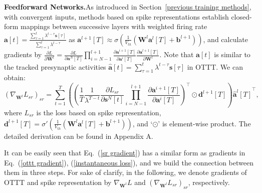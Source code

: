 \documentclass{article}
\begin{document}
\textbf{Feedforward Networks.}\quad As introduced in Section~\ref{previous training methods}, with convergent inputs, methods based on spike representations establish closed-form mappings between successive layers with weighted firing rate $\mathbf{a}[t]=\frac{\sum_{\tau=1}^t \lambda^{t-\tau}\mathbf{s}[\tau]}{\sum_{\tau=1}^t \lambda^{t-\tau}}$ as $\mathbf{a}^{l+1}[T] \approx \sigma\left(\frac{1}{V_{th}}\left(\mathbf{W}^l\mathbf{a}^l[T]+\mathbf{b}^{l+1}\right)\right)$, and calculate gradients by $\frac{\partial L}{\partial \mathbf{W}^l}=\frac{\partial L}{\partial \mathbf{a}^N[T]}\prod_{i=N-1}^{l+1}\frac{\partial \mathbf{a}^{i+1}[T]}{\partial \mathbf{a}^i[T]}\frac{\partial \mathbf{a}^{l+1}[T]}{\partial \mathbf{W}^l}$. Note that $\mathbf{a}[t]$ is similar to the tracked presynaptic activities $\hat{\mathbf{a}}[t]=\sum_{\tau=1}^t \lambda^{t-\tau}\mathbf{s}[\tau]$ in OTTT. We can obtain: 
\begin{equation}
    \left(\nabla_{\mathbf{W}^l}L_{sr}\right)_{sr} = \sum_{t=1}^T\left(\left(\frac{1}{T}\frac{1}{\lambda^{T-t}}\frac{\partial L_{sr}}{\partial \mathbf{s}^N[t]}\prod_{i=N-1}^{l+1}\frac{\partial \mathbf{a}^{i+1}[T]}{\partial \mathbf{a}^i[T]}\right)^\top\odot \mathbf{d}^{l+1}[T]\right){\hat{\mathbf{a}}^l[T]}^\top,
    \label{sr gradient}
\end{equation}
where $L_{sr}$ is the loss based on spike representation, $\mathbf{d}^{l+1}[T]=\sigma'\left(\frac{1}{V_{th}}\left(\mathbf{W}^l\mathbf{a}^l[T]+\mathbf{b}^{l+1}\right)\right)$, and `$\odot$' is element-wise product. The detailed derivation can be found in Appendix A. 

It can be easily seen that Eq.~(\ref{sr gradient}) has a similar form as gradients in Eq.~(\ref{ottt gradient}), (\ref{instantaneous loss}), and we build the connection between them in three steps. For sake of clarify, in the following, we denote gradients of OTTT and spike representation by $\nabla_{\mathbf{W}^l}L$ and $\left(\nabla_{\mathbf{W}^l}L_{sr}\right)_{sr}$, respectively. 
\end{document}
